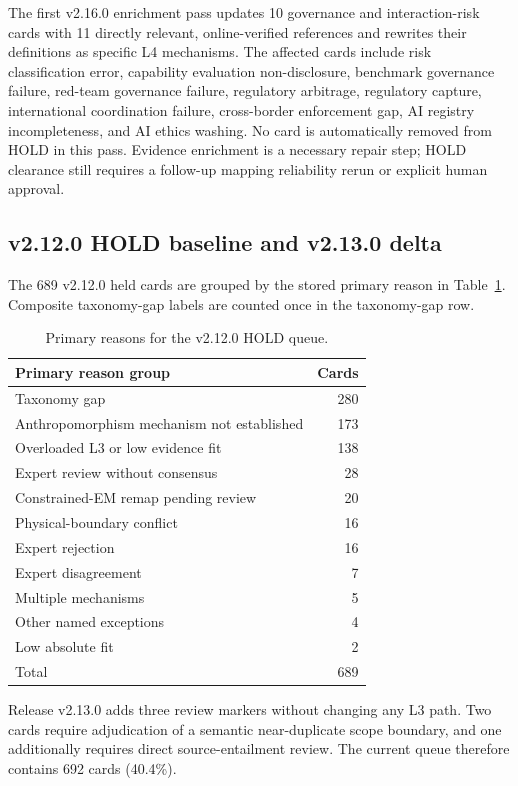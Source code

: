 \documentclass[11pt,a4paper]{article}
\begin{document}
The first v2.16.0 enrichment pass updates 10 governance and interaction-risk
cards with 11 directly relevant, online-verified references and rewrites their
definitions as specific L4 mechanisms. The affected cards include risk
classification error, capability evaluation non-disclosure, benchmark
governance failure, red-team governance failure, regulatory arbitrage,
regulatory capture, international coordination failure, cross-border
enforcement gap, AI registry incompleteness, and AI ethics washing. No card is
automatically removed from HOLD in this pass. Evidence enrichment is a
necessary repair step; HOLD clearance still requires a follow-up mapping
reliability rerun or explicit human approval.

\subsection{v2.12.0 HOLD baseline and v2.13.0 delta}

The 689 v2.12.0 held cards are grouped by the stored primary reason in
Table~\ref{tab:holdreasons}. Composite taxonomy-gap labels are counted once in
the taxonomy-gap row.

\begin{table}[H]
\centering
\caption{Primary reasons for the v2.12.0 HOLD queue.}
\label{tab:holdreasons}
\small
\begin{tabular}{lr}
\toprule
Primary reason group & Cards \\
\midrule
Taxonomy gap & 280 \\
Anthropomorphism mechanism not established & 173 \\
Overloaded L3 or low evidence fit & 138 \\
Expert review without consensus & 28 \\
Constrained-EM remap pending review & 20 \\
Physical-boundary conflict & 16 \\
Expert rejection & 16 \\
Expert disagreement & 7 \\
Multiple mechanisms & 5 \\
Other named exceptions & 4 \\
Low absolute fit & 2 \\
\midrule
Total & 689 \\
\bottomrule
\end{tabular}
\end{table}

Release v2.13.0 adds three review markers without changing any L3 path. Two
cards require adjudication of a semantic near-duplicate scope boundary, and
one additionally requires direct source-entailment review. The current queue
therefore contains 692 cards (40.4\%).
\end{document}

